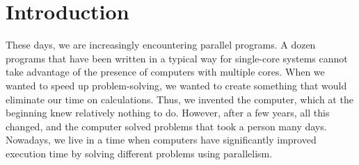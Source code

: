 \chapter{Introduction}

These days, we are increasingly encountering parallel programs.
A dozen programs that have been written in a typical way for single-core systems cannot take advantage of the presence of computers with multiple cores.
When we wanted to speed up problem-solving, we wanted to create something that would eliminate our time on calculations.
Thus, we invented the computer, which at the beginning knew relatively nothing to do.
However, after a few years, all this changed, and the computer solved problems that took a person many days.
Nowadays, we live in a time when computers have significantly improved execution time by solving different problems using parallelism.

